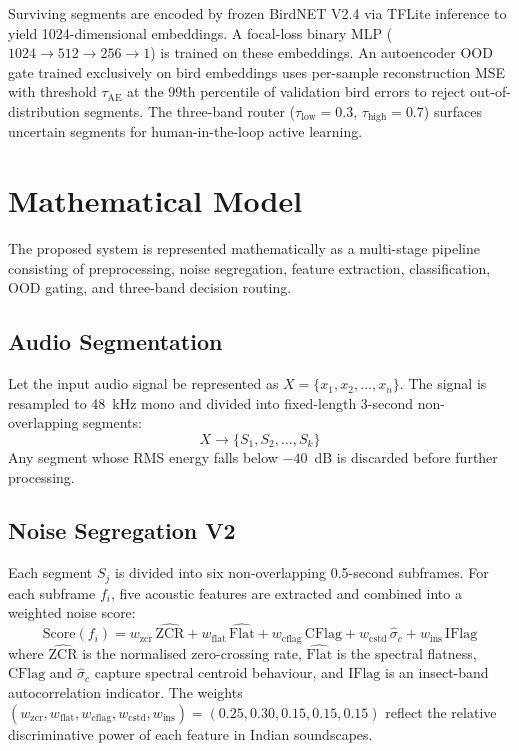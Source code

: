 \documentclass[a4paper,12pt]{article}
\begin{document}
\vspace{0.3cm}

\noindent
Surviving segments are encoded by frozen BirdNET V2.4 via TFLite inference to yield
1024-dimensional embeddings. A focal-loss binary MLP ($1024 \to 512 \to 256 \to 1$) is trained
on these embeddings. An autoencoder OOD gate trained exclusively on bird embeddings uses
per-sample reconstruction MSE with threshold $\tau_{\mathrm{AE}}$ at the 99th percentile of
validation bird errors to reject out-of-distribution segments. The three-band router
($\tau_{\mathrm{low}} = 0.3$, $\tau_{\mathrm{high}} = 0.7$) surfaces uncertain segments for
human-in-the-loop active learning.

\section{Mathematical Model}

\noindent
The proposed system is represented mathematically as a multi-stage pipeline consisting of
preprocessing, noise segregation, feature extraction, classification, OOD gating, and
three-band decision routing.

\subsection{Audio Segmentation}

\noindent
Let the input audio signal be represented as $X = \{x_1, x_2, \ldots, x_n\}$. The signal is
resampled to 48~kHz mono and divided into fixed-length 3-second non-overlapping segments:
\[
    X \rightarrow \{S_1, S_2, \ldots, S_k\}
\]
Any segment whose RMS energy falls below $-40$~dB is discarded before further processing.

\subsection{Noise Segregation V2}

\noindent
Each segment $S_j$ is divided into six non-overlapping 0.5-second subframes. For each subframe
$f_i$, five acoustic features are extracted and combined into a weighted noise score:
\[
    \mathrm{Score}(f_i) = w_{\mathrm{zcr}}\,\widehat{\mathrm{ZCR}}
                      + w_{\mathrm{flat}}\,\widehat{\mathrm{Flat}}
                      + w_{\mathrm{cflag}}\,\mathrm{CFlag}
                      + w_{\mathrm{cstd}}\,\hat{\sigma}_c
                      + w_{\mathrm{ins}}\,\mathrm{IFlag}
\]
where $\widehat{\mathrm{ZCR}}$ is the normalised zero-crossing rate, $\widehat{\mathrm{Flat}}$
is the spectral flatness, $\mathrm{CFlag}$ and $\hat{\sigma}_c$ capture spectral centroid
behaviour, and $\mathrm{IFlag}$ is an insect-band autocorrelation indicator. The weights
$(w_{\mathrm{zcr}}, w_{\mathrm{flat}}, w_{\mathrm{cflag}}, w_{\mathrm{cstd}}, w_{\mathrm{ins}})
= (0.25, 0.30, 0.15, 0.15, 0.15)$ reflect the relative discriminative power of each feature
in Indian soundscapes.
\end{document}
